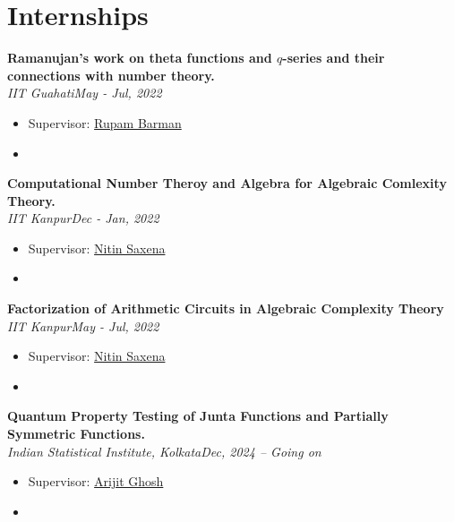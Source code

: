 \documentclass[letterpaper,10pt]{article}
\newcommand{\heading}[2]{
  \hspace{10pt}#1\hfill#2\\
}
\newcommand{\headingBf}[2]{
  \heading{\textbf{#1}}{\textbf{#2}}
}
\newcommand{\headingIt}[2]{
  \heading{\textit{#1}}{\textit{#2}}
}
\newenvironment{resume_list}{
  \vspace{-7pt}
  \begin{itemize}[itemsep=-2px, parsep=1pt, leftmargin=30pt]
}{
  \end{itemize}
}
\begin{document}
\section{Internships}
\begin{resume_list}
	\item \headingBf{Ramanujan’s work on theta functions and $q$-series and their connections with number theory.}{}
	\headingIt{IIT Guahati}{May - Jul, 2022}
	\begin{itemize}
		\item Supervisor: \href{https://www.iitg.ac.in/rupam/}{Rupam Barman}
		\item 
	\end{itemize}

\item \headingBf{Computational Number Theroy and Algebra for Algebraic Comlexity Theory.}{}
\headingIt{IIT Kanpur}{Dec - Jan, 2022}
\begin{itemize}
	\item Supervisor: \href{https://www.cse.iitk.ac.in/users/nitin/}{Nitin Saxena}
	\item 
\end{itemize}

\item \headingBf{Factorization of Arithmetic Circuits in Algebraic Complexity Theory}{}
\headingIt{IIT Kanpur}{May - Jul, 2022}
\begin{itemize}
	\item Supervisor: \href{https://www.cse.iitk.ac.in/users/nitin/}{Nitin Saxena}
	\item 
\end{itemize}

\item \headingBf{Quantum Property Testing of Junta Functions and Partially Symmetric Functions.}{}
\headingIt{Indian Statistical Institute, Kolkata}{Dec, 2024 -- Going on}
\begin{itemize}
	\item Supervisor: \href{https://sites.google.com/site/homepagearijitghosh/}{Arijit Ghosh}
	\item 
\end{itemize}


\end{resume_list}
\end{document}
